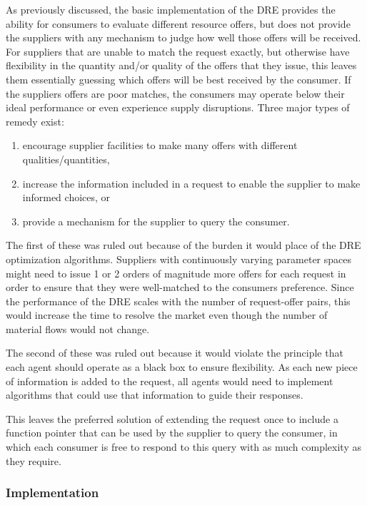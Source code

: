 As previously discussed, the basic implementation of the \gls{DRE} provides
the ability for consumers to evaluate different resource offers, but does not
provide the suppliers with any mechanism to judge how well those offers will
be received.  For suppliers that are unable to match the request exactly, but
otherwise have flexibility in the quantity and/or quality of the offers that
they issue, this leaves them essentially guessing which offers will be best
received by the consumer.  If the suppliers offers are poor matches, the
consumers may operate below their ideal performance or even experience supply
disruptions.  Three major types of remedy exist:
\begin{enumerate}
\item encourage supplier facilities to make many offers with different
  qualities/quantities,
\item increase the information included in a request to enable the supplier to
  make informed choices, or
\item provide a mechanism for the supplier to query the consumer.
\end{enumerate}

The first of these was ruled out because of the burden it would place of the
\gls{DRE} optimization algorithms.  Suppliers with continuously varying
parameter spaces might need to issue 1 or 2 orders of magnitude more offers for
each request in order to ensure that they were well-matched to the consumers
preference.  Since the performance of the \gls{DRE} scales with the number of
request-offer pairs, this would increase the time to resolve the market even
though the number of material flows would not change.

The second of these was ruled out because it would violate the
\Cyclus{} principle that each agent should operate as a black box to ensure
flexibility.  As each new piece of information is added to the request, all
agents would need to implement algorithms that could use that information to
guide their responses.  

This leaves the preferred solution of extending the request once to include a
function pointer that can be used by the supplier to query the consumer, in
which each consumer is free to respond to this query with as much complexity
as they require.


\subsubsection{Implementation}

